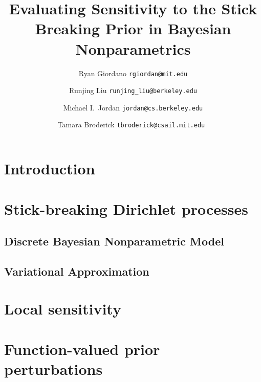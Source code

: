 \documentclass[11pt]{article}
\begin{document}
\title{Evaluating Sensitivity to the Stick Breaking Prior in Bayesian Nonparametrics}

\author{Ryan Giordano \texttt{rgiordan@mit.edu} \\
        \and
        Runjing Liu \texttt{runjing\_liu@berkeley.edu} \\
        \and
        Michael I.\ Jordan \texttt{jordan@cs.berkeley.edu} \\
        \and
        Tamara Broderick \texttt{tbroderick@csail.mit.edu }
        }

\maketitle

\begin{abstract}%

\end{abstract}

\section{Introduction}



\section{Stick-breaking Dirichlet processes}
    \subsection{Discrete Bayesian Nonparametric Model}
    

    \subsection{Variational Approximation}
    


\section{Local sensitivity}


\section{Function-valued prior perturbations}

\end{document}
